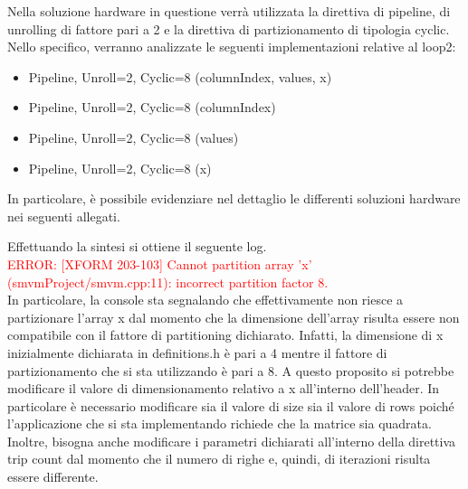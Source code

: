 Nella soluzione hardware in questione verrà utilizzata la direttiva di pipeline, di unrolling di fattore pari a 2 e la direttiva di partizionamento di tipologia cyclic. Nello specifico, verranno analizzate le seguenti implementazioni relative al loop2:
\begin{itemize}
	\item Pipeline, Unroll=2, Cyclic=8 (columnIndex, values, x)
	\item Pipeline, Unroll=2, Cyclic=8 (columnIndex)
	\item Pipeline, Unroll=2, Cyclic=8 (values)
	\item Pipeline, Unroll=2, Cyclic=8 (x)
\end{itemize}

In particolare, è possibile evidenziare nel dettaglio le differenti soluzioni hardware nei seguenti allegati.





Effettuando la sintesi si ottiene il seguente log.
\\
\textcolor{red}{ERROR: [XFORM 203-103] Cannot partition array 'x' (smvmProject/smvm.cpp:11): incorrect partition factor 8.}
\\
In particolare, la console sta segnalando che effettivamente non riesce a partizionare l'array x dal momento che la dimensione dell'array risulta essere non compatibile con il fattore di partitioning dichiarato. Infatti, la dimensione di x inizialmente dichiarata in definitions.h è pari a 4 mentre il fattore di partizionamento che si sta utilizzando è pari a 8. A questo proposito si potrebbe modificare il valore di dimensionamento relativo a x all'interno dell'header. In particolare è necessario modificare sia il valore di size sia il valore di rows poiché l'applicazione che si sta implementando richiede che la matrice sia quadrata. Inoltre, bisogna anche modificare i parametri dichiarati all'interno della direttiva trip count dal momento che il numero di righe e, quindi, di iterazioni risulta essere differente.






